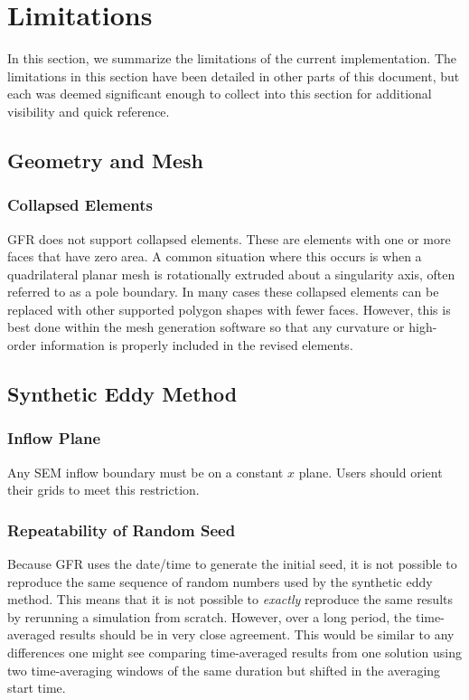\section{Limitations}

In this section, we summarize the limitations of the current implementation.
%
The limitations in this section have been detailed in other parts of this
document, but each was deemed significant enough to collect into this section
for additional visibility and quick reference.


\subsection{Geometry and Mesh}

\subsubsection{Collapsed Elements}

GFR does not support collapsed elements.
%
These are elements with one or more faces that have zero area.
%
A common situation where this occurs is when a quadrilateral planar
mesh is rotationally extruded about a singularity axis, often
referred to as a pole boundary.
% 
In many cases these collapsed elements can be replaced with other
supported polygon shapes with fewer faces.
%
However, this is best done within the mesh generation software
so that any curvature or high-order information is properly
included in the revised elements.


\subsection{Synthetic Eddy Method}

\subsubsection{Inflow Plane}

Any SEM inflow boundary must be on a constant $x$ plane.
%
Users should orient their grids to meet this restriction.


\subsubsection{Repeatability of Random Seed}

Because GFR uses the date\slash time to generate the initial seed,
it is not possible to reproduce the same sequence of random numbers
used by the synthetic eddy method.
%
This means that it is not possible to \emph{exactly} reproduce the same
results by rerunning a simulation from scratch.
%
However, over a long period, the time-averaged results should be in
very close agreement.
%
This would be similar to any differences one might see comparing time-averaged
results from one solution using two time-averaging windows of the same
duration but shifted in the averaging start time.


